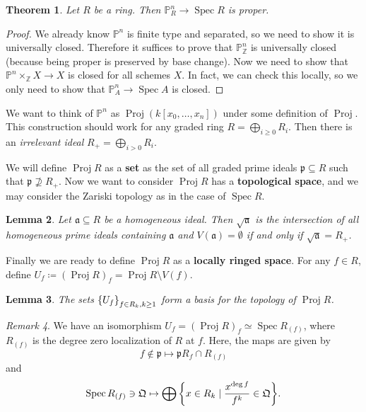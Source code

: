 \documentclass[leqno, openany]{memoir}
\newtheorem{thm}{Theorem}[section]
\newtheorem{lem}[thm]{Lemma}
\theoremstyle{definition}
\theoremstyle{remark}
\newtheorem{rmk}[thm]{Remark}
\theoremstyle{plain}
\theoremstyle{definition}
\theoremstyle{remark}
\newcommand{\Z}{\mathbb{Z}}
\renewcommand{\P}{\mathbb{P}}
\newcommand{\mf}[1]{\mathfrak{#1}}
\DeclareMathOperator{\Spec}{Spec}
\DeclareMathOperator{\Proj}{Proj}
\begin{document}
\begin{thm}
    Let $R$ be a ring. Then $\P^n_R \to \Spec R$ is proper.
\end{thm}

\begin{proof}
    We already know $\P^n$ is finite type and separated, so we need to show it is universally closed. Therefore it suffices to prove that $\P^n_{\Z}$ is universally closed (because being proper is preserved by base change). Now we need to show that $\P^n \times_{\Z} X \to X$ is closed for all schemes $X$. In fact, we can check this locally, so we only need to show that $\P^n_{A} \to \Spec A$ is closed.
\end{proof}

We want to think of $\P^n$ as $\Proj(k[x_0, \ldots, x_n])$ under some definition of $\Proj$. This construction should work for any graded ring $R = \bigoplus_{i \geq 0} R_i$. Then there is an \textit{irrelevant ideal} $R_+ = \bigoplus_{i > 0} R_i$. 

We will define $\Proj R$ as a \textbf{set} as the set of all graded prime ideals $\mf{p} \subseteq R$ such that $\mf{p} \not\supseteq R_+$. Now we want to consider $\Proj R$ has a \textbf{topological space}, and we may consider the Zariski topology as in the case of $\Spec R$. 

\begin{lem}
    Let $\mf{a} \subseteq R$ be a homogeneous ideal. Then $\sqrt{\mf{a}}$ is the intersection of all homogeneous prime ideals containing $\mf{a}$ and $V(\mf{a}) = \emptyset$ if and only if $\sqrt{\mf{a}} = R_+$.
\end{lem}

Finally we are ready to define $\Proj R$ as a \textbf{locally ringed space}. For any $f \in R$, define $U_f \coloneqq {(\Proj R)}_f = \Proj R \setminus V(f)$. 

\begin{lem}
    The sets $\qty{U_f}_{f \in R_k, k \geq 1}$ form a basis for the topology of $\Proj R$.
\end{lem}

\begin{rmk}\leavevmode
    We have an isomorphism $U_f = { (\Proj R) }_f \simeq \Spec R_{(f)}$, where $R_{(f)}$ is the degree zero localization of $R$ at $f$. Here, the maps are given by 
    \[ f \notin \mf{p} \mapsto \mf{p} R_f \cap R_{(f)} \] and 
    \[ \Spec R_{(f)} \ni \mf{Q} \mapsto \bigoplus \qty{x \in R_k \mid \frac{x^{\deg f}}{f^k} \in \mf{Q}}. \]
\end{rmk}
\end{document}
